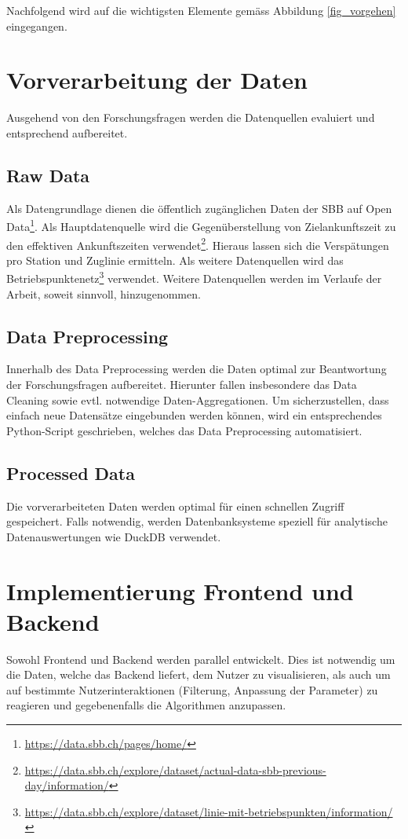 Nachfolgend wird auf die wichtigsten Elemente gemäss Abbildung \ref{fig_vorgehen} eingegangen.

\section{Vorverarbeitung der Daten}
Ausgehend von den Forschungsfragen werden die Datenquellen evaluiert und entsprechend aufbereitet.

\subsection{Raw Data}
Als Datengrundlage dienen die öffentlich zugänglichen Daten der SBB auf Open Data\footnote{\url{https://data.sbb.ch/pages/home/}}. Als Hauptdatenquelle wird die Gegenüberstellung von Zielankunftszeit zu den effektiven Ankunftszeiten verwendet\footnote{\url{https://data.sbb.ch/explore/dataset/actual-data-sbb-previous-day/information/}}. Hieraus lassen sich die Verspätungen pro Station und Zuglinie ermitteln. Als weitere Datenquellen wird das Betriebspunktenetz\footnote{\url{https://data.sbb.ch/explore/dataset/linie-mit-betriebspunkten/information/}} verwendet. Weitere Datenquellen werden im Verlaufe der Arbeit, soweit sinnvoll, hinzugenommen.

\subsection{Data Preprocessing}
Innerhalb des Data Preprocessing werden die Daten optimal zur Beantwortung der Forschungsfragen aufbereitet. Hierunter fallen insbesondere das Data Cleaning sowie evtl. notwendige Daten-Aggregationen. Um sicherzustellen, dass einfach neue Datensätze eingebunden werden können, wird ein entsprechendes Python-Script geschrieben, welches das Data Preprocessing automatisiert.

\subsection{Processed Data}
Die vorverarbeiteten Daten werden optimal für einen schnellen Zugriff gespeichert. Falls notwendig, werden  Datenbanksysteme speziell für analytische Datenauswertungen wie DuckDB verwendet.

\section{Implementierung Frontend und Backend}
Sowohl Frontend und Backend werden parallel entwickelt. Dies ist notwendig um die Daten, welche das Backend liefert, dem Nutzer zu visualisieren, als auch um auf bestimmte Nutzerinteraktionen (Filterung, Anpassung der Parameter) zu reagieren und gegebenenfalls die Algorithmen anzupassen.

